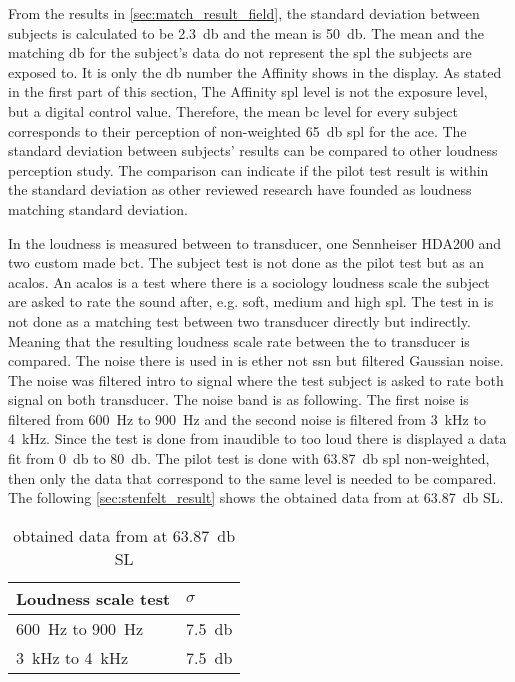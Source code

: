 From the results in \autoref{sec:match_result_field}, the standard deviation between subjects is calculated to be \SI{2.3}{\decibel} and the mean is \SI{50}{\decibel}. The mean and the matching \si{\decibel} for the subject's data do not represent the \gls{spl} the subjects are exposed to. It is only the \si{\decibel} number the Affinity shows in the display. As stated in the first part of this section, The Affinity  \gls{spl} level is not the exposure level, but a digital control value. Therefore, the mean \gls{bc} level for every subject corresponds to their perception of non-weighted \SI{65}{\decibel} \gls{spl}  for the \gls{ace}. The standard deviation between subjects' results can be compared to other loudness perception study. The comparison can indicate if the pilot test result is within the standard deviation as other reviewed research have founded as loudness matching standard deviation. 

In \citep{STENFELT201385} the loudness is measured between to transducer, one Sennheiser HDA200 and two custom made \gls{bct}. The subject test is not done as the pilot test but as an \gls{acalos}. An \gls{acalos} is a test where there is a sociology loudness scale the subject are asked to rate the sound after, e.g. soft, medium and high \gls{spl}. The test in \citep{STENFELT201385} is not done as a matching test between two transducer directly but indirectly. Meaning that the resulting loudness scale rate between the to transducer is compared. The noise there is used in \citep{STENFELT201385} is ether not \gls{ssn} but filtered Gaussian noise. The noise was filtered intro to signal where the test subject is asked to rate both signal on both transducer. The noise band is as following. The first noise is filtered from \SI{600}{\hertz} to \SI{900}{\hertz} and the second noise is filtered from \SI{3}{\kilo\hertz} to \SI{4}{\kilo\hertz}. Since the test is done from inaudible to too loud there is displayed a data fit from \SI{0}{\decibel} to \SI{80}{\decibel}. The pilot test is done with \SI{63.87}{\decibel} \gls{spl} non-weighted, then only the data that correspond to the same level is needed to be compared. The following \autoref{sec:stenfelt_result} shows the obtained data from \citep{STENFELT201385} at \SI{63.87}{\decibel} SL.


\begin{table}[H]
\centering
\caption{obtained data from \citep{STENFELT201385} at \SI{63.87}{\decibel} SL}
\begin{tabular}{l|l}
Loudness scale test                        & $\sigma$            \\ \hline
\SI{600}{\hertz} to \SI{900}{\hertz}       & \SI{7.5}{\decibel} \\
\SI{3}{\kilo\hertz} to \SI{4}{\kilo\hertz} & \SI{7.5}{\decibel}
\end{tabular}
\label{sec:stenfelt_result}
\end{table}

